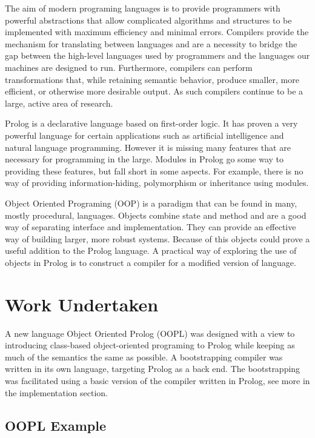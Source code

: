\documentclass[12pt,a4paper,twoside,openright]{report}
\begin{document}
The aim of modern programing languages is to provide programmers with powerful abstractions that allow complicated algorithms and structures to be implemented with maximum efficiency and minimal errors. Compilers provide the mechanism for translating between languages and are a necessity to bridge the gap between the high-level languages used by programmers and the languages our machines are designed to run. Furthermore, compilers can perform transformations that, while retaining semantic behavior, produce smaller, more efficient, or otherwise more desirable output. As such compilers continue to be a large, active area of research.

\bigskip

Prolog is a declarative language based on first-order logic. It has proven a very powerful language for certain applications such as artificial intelligence\cite{AIBOOK} and natural language programming\cite{NLPBOOK}. However it is missing many features that are necessary for programming in the large. Modules in Prolog go some way to providing these features, but fall short in some aspects. For example, there is no way of providing information-hiding, polymorphism or inheritance using modules.

\bigskip

Object Oriented Programing (OOP) is a paradigm that can be found in many, mostly procedural, languages. Objects combine state and method and are a good way of separating interface and implementation. They can provide an effective way of building larger, more robust systems. Because of this objects could prove a useful addition to the Prolog language. A practical way of exploring the use of objects in Prolog is to construct a compiler for a modified version of language.

\section{Work Undertaken}

A new language Object Oriented Prolog (OOPL) was designed with a view to introducing class-based object-oriented programing to Prolog while keeping as much of the semantics the same as possible. A bootstrapping compiler was written in its own language, targeting Prolog as a back end. The bootstrapping was facilitated using a basic version of the compiler written in Prolog, see more in the implementation section.

\subsection {OOPL Example}
\end{document}
